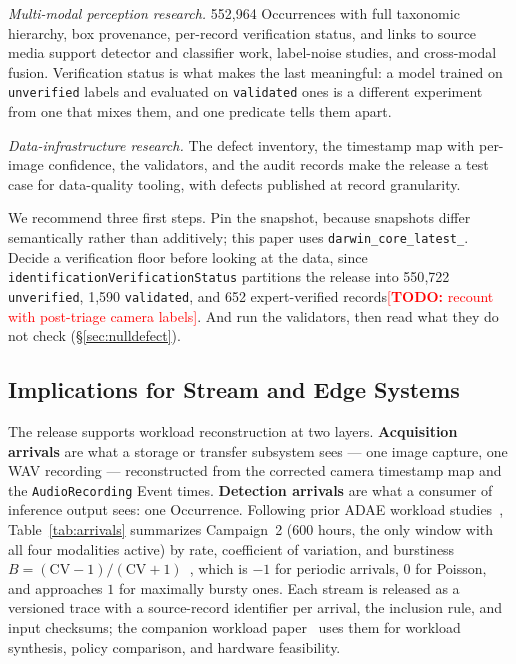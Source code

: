 \documentclass[sigconf]{acmart}
\newcommand{\TODO}[1]{\textcolor{red}{\footnotesize[\textbf{TODO:} #1]}}
\newcommand{\TODO}[1]{}
\begin{document}
\emph{Multi-modal perception research.} 552{,}964 Occurrences with full
taxonomic hierarchy, box provenance, per-record verification status, and
links to source media support detector and classifier work, label-noise
studies, and cross-modal fusion. Verification status is what makes the
last meaningful: a model trained on \texttt{unverified} labels and evaluated
on \texttt{validated} ones is a different experiment from one that mixes
them, and one predicate tells them apart.

\emph{Data-infrastructure research.} The defect inventory, the timestamp
map with per-image confidence, the validators, and the audit records
make the release a test case for data-quality tooling, with defects
published at record granularity.



We recommend three first steps. Pin the snapshot, because snapshots
differ semantically rather than additively; this paper uses
\texttt{darwin\_core\_\allowbreak latest\_}. Decide a verification floor before
looking at the data, since
\texttt{identification\allowbreak Verification\allowbreak Status} partitions the release into
550{,}722 \texttt{unverified}, 1{,}590 \texttt{validated}, and
652 expert-verified records\TODO{recount with post-triage camera labels}.
And run the validators, then read what
they do not check (\S\ref{sec:nulldefect}).

\subsection{Implications for Stream and Edge Systems}
\label{sec:characterization}
\label{sec:effort}

The release supports workload reconstruction at two layers.
\textbf{Acquisition arrivals} are what a storage or transfer subsystem
sees --- one image capture, one WAV recording --- reconstructed from the
corrected camera timestamp map and the \texttt{AudioRecording} Event
times. \textbf{Detection arrivals} are what a consumer of inference
output sees: one Occurrence. Following prior ADAE workload
studies~\cite{kline2024characterizing,kline2026blueprint},
Table~\ref{tab:arrivals} summarizes Campaign~2 (600 hours, the only
window with all four modalities active) by rate, coefficient of
variation, and burstiness
$B = (\mathrm{CV}-1)/(\mathrm{CV}+1)$~\cite{goh2008burstiness}, which is
$-1$ for periodic arrivals, $0$ for Poisson, and approaches $1$ for
maximally bursty ones. Each stream is released as a versioned trace
with a source-record identifier per arrival, the inclusion rule, and
input checksums; the companion workload paper~\cite{kline2026blueprint}
uses them for workload synthesis, policy comparison, and hardware
feasibility.
\end{document}
